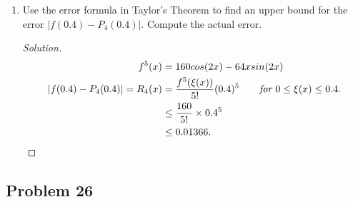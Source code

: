 \documentclass{article}
\begin{document}
\begin{enumerate}[label=(\alph*)]
    \item Use the error formula in Taylor's Theorem to find an upper bound for the error
    $|f(0.4) - P_4(0.4)|$. Compute the actual error.

    \begin{proof}[Solution]
        \begin{align*}
            f^5(x) & = 160cos(2x) - 64xsin(2x) \\
            |f(0.4) - P_4(0.4)| = R_4(x) & = \frac{f^5(\xi(x))}{5!}(0.4)^5 \qquad 
            \emph{for } 0 \le \xi(x) \le 0.4. \\
            & \le \frac{160}{5!}\times 0.4^5 \\
            & \le 0.01366.
        \end{align*}
    \end{proof}
\end{enumerate}

\subsection*{Problem 26} 
\end{document}
